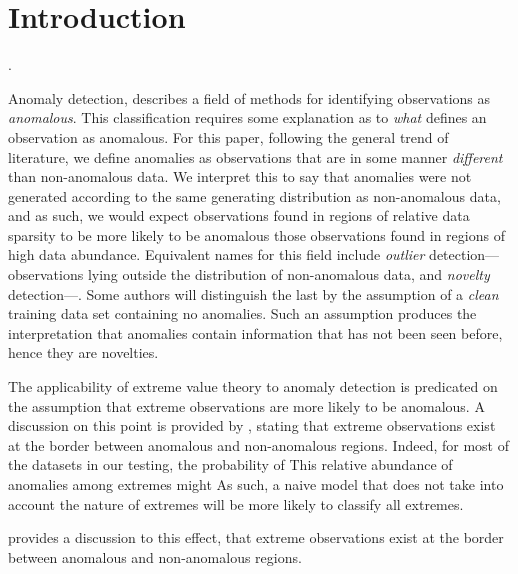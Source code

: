 \section{Introduction}


.




Anomaly detection, describes a field of methods for identifying observations as \emph{anomalous}.
    This classification requires some explanation as to \emph{what} defines an observation as anomalous.
    For this paper, following the general trend of literature, we define anomalies
    as observations that are in some manner \emph{different} than non-anomalous data. We interpret this to
    say that anomalies were not generated according to the same generating distribution as non-anomalous data,
    and as such, we would expect observations found in regions of relative data sparsity to be more likely to be
    anomalous those observations found in regions of high data abundance.
    Equivalent names for this field include \emph{outlier} detection---observations lying outside the
    distribution of non-anomalous data, and \emph{novelty} detection---.  Some authors will
    distinguish the last by the assumption of a \emph{clean} training data set containing no anomalies.  Such
    an assumption produces the interpretation that anomalies contain information that has not been seen before,
    hence they are novelties.

The applicability of extreme value theory to anomaly detection is predicated on the assumption that
  extreme observations are more likely to be anomalous.  A discussion on this point is provided by \cite{goix2017},
  stating that extreme observations exist at the border between anomalous and non-anomalous regions.  Indeed,
  for most of the datasets in our testing, the probability of This
  relative abundance of anomalies among extremes might As such,
  a naive model that does not take into account the nature of extremes will be more likely to classify all
  extremes.  
  
  
  \cite{goix2017} provides a discussion to
  this effect, that extreme observations exist at the border between anomalous and non-anomalous regions.
  

